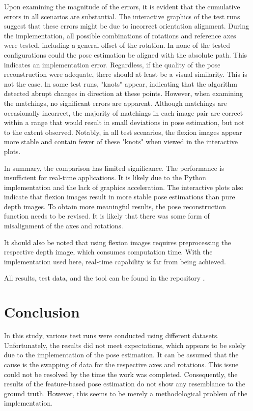\documentclass[conference, a4paper]{IEEEtran}
\begin{document}
Upon examining the magnitude of the errors, it is evident that the cumulative errors in all scenarios are substantial. The interactive graphics of the test runs suggest that these errors might be due to incorrect orientation alignment. During the implementation, all possible combinations of rotations and reference axes were tested, including a general offset of the rotation. In none of the tested configurations could the pose estimation be aligned with the absolute path. This indicates an implementation error. Regardless, if the quality of the pose reconstruction were adequate, there should at least be a visual similarity. This is not the case. In some test runs, "knots" appear, indicating that the algorithm detected abrupt changes in direction at these points. However, when examining the matchings, no significant errors are apparent. Although matchings are occasionally incorrect, the majority of matchings in each image pair are correct within a range that would result in small deviations in pose estimation, but not to the extent observed. Notably, in all test scenarios, the flexion images appear more stable and contain fewer of these "knots" when viewed in the interactive plots.

In summary, the comparison has limited significance. The performance is insufficient for real-time applications. It is likely due to the Python implementation and the lack of graphics acceleration. The interactive plots also indicate that flexion images result in more stable pose estimations than pure depth images. To obtain more meaningful results, the pose reconstruction function needs to be revised. It is likely that there was some form of misalignment of the axes and rotations. 

It should also be noted that using flexion images requires preprocessing the respective depth image, which consumes computation time. With the implementation used here, real-time capability is far from being achieved\cite{fleischer}.

All results, test data, and the tool can be found in the repository \cite{repo1}.


\section{Conclusion}

In this study, various test runs were conducted using different datasets. Unfortunately, the results did not meet expectations, which appears to be solely due to the implementation of the pose estimation. It can be assumed that the cause is the swapping of data for the respective axes and rotations. This issue could not be resolved by the time the work was completed. Consequently, the results of the feature-based pose estimation do not show any resemblance to the ground truth. However, this seems to be merely a methodological problem of the implementation.
\end{document}
